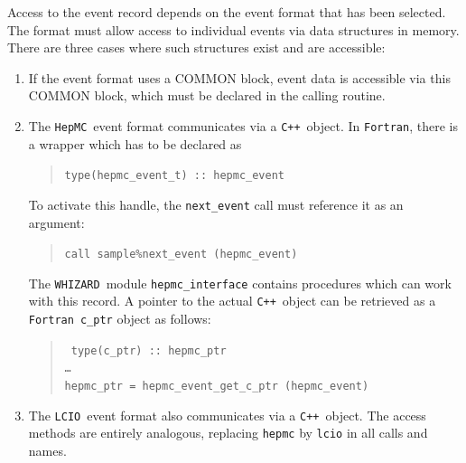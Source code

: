 \documentclass[12pt]{book}
\newcommand{\ttt}[1]{\texttt{#1}}
\newcommand{\whizard}{\ttt{WHIZARD}}
\newcommand{\lcio}{\ttt{LCIO}}
\newcommand{\hepmc}{\ttt{HepMC}}
\newcommand{\cpp}{\ttt{C++}}
\newcommand{\fortran}{\ttt{Fortran}}
\begin{document}
Access to the event record depends on the event format that has been
selected.  The format must allow access to individual events via data
structures in memory.  There are three cases where such structures exist and
are accessible:
\begin{enumerate}
\item
  If the event format uses a COMMON block, event data is accessible
  via this COMMON block, which must be declared in the calling routine.
\item
  The \hepmc\ event format communicates via a \cpp\ object.  In \fortran, there
  is a wrapper which has to be declared as
  \begin{quote}
    \tt type(hepmc\_event\_t) :: hepmc\_event
  \end{quote}
  To activate this handle, the \ttt{next\_event} call must reference it as
  an argument:
  \begin{quote}
    \tt call sample\%next\_event (hepmc\_event)
  \end{quote}
  The \whizard\ module \ttt{hepmc\_interface} contains procedures which can
  work with this record.  A pointer to the actual \cpp\ object can be retrieved
  as a \fortran\
  \ttt{c\_ptr} object as follows:
  \begin{quote}
    \tt
    type(c\_ptr) :: hepmc\_ptr
    \\
    \dots
    \\
    hepmc\_ptr = hepmc\_event\_get\_c\_ptr (hepmc\_event)
  \end{quote}
\item
  The \lcio\ event format also communicates via a \cpp\ object.  The access
  methods are entirely analogous, replacing \ttt{hepmc} by \ttt{lcio} in all
  calls and names.
\end{enumerate}
\end{document}
